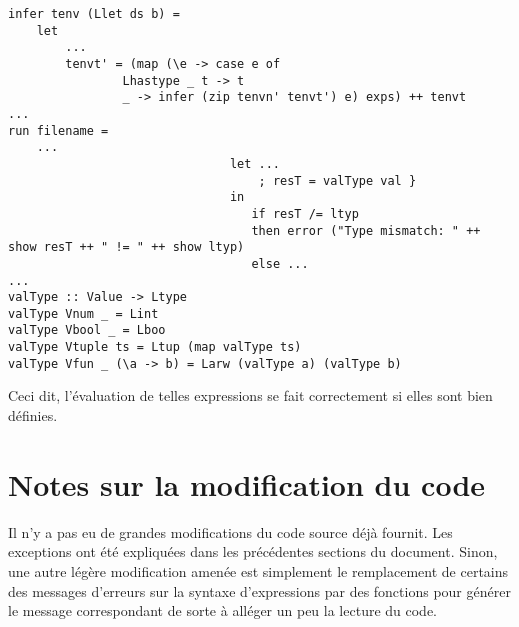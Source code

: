 \documentclass[10pt, titlepage]{article}
\begin{document}
\begin{lstlisting}
infer tenv (Llet ds b) =
    let
        ...
        tenvt' = (map (\e -> case e of
                Lhastype _ t -> t
                _ -> infer (zip tenvn' tenvt') e) exps) ++ tenvt
...
run filename =
    ...
                               let ...
                                   ; resT = valType val }
                               in 
                                  if resT /= ltyp
                                  then error ("Type mismatch: " ++ show resT ++ " != " ++ show ltyp)
                                  else ...
...
valType :: Value -> Ltype
valType Vnum _ = Lint
valType Vbool _ = Lboo
valType Vtuple ts = Ltup (map valType ts)
valType Vfun _ (\a -> b) = Larw (valType a) (valType b)
\end{lstlisting}
Ceci dit, l'évaluation de telles expressions se fait correctement si elles sont
bien définies.

\section{Notes sur la modification du code}

Il n'y a pas eu de grandes modifications du code source déjà fournit. Les
exceptions ont été expliquées dans les précédentes sections du document. Sinon,
une autre légère modification amenée est simplement le remplacement de certains
des messages d'erreurs sur la syntaxe d'expressions par des fonctions pour
générer le message correspondant de sorte à alléger un peu la lecture du code.
\end{document}
